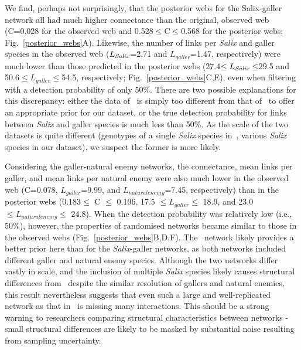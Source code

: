 \documentclass[12pt]{article}
\begin{document}
\begin{spacing}{2.0}
    We find, perhaps not surprisingly, that the posterior webs for the Salix-galler network all had much higher connectance than the original, observed web (C=0.028 for the observed web and 0.528$\leq$C$\leq$0.568 for the posterior webs; Fig.~\ref{posterior_webs}A). Likewise, the number of links per \emph{Salix} and galler species in the observed web ($L_{\emph{Salix}}$=2.71 and $L_{galler}$=1.47, respectively) were much lower than those predicted in the posterior webs (27.4$\leq L_{\emph{Salix}} \leq$29.5 and 50.6$\leq L_{galler} \leq $54.5, respectively; Fig.~\ref{posterior_webs}C,E), even when filtering with a detection probability of only 50\%. There are two possible explanations for this discrepancy: either the data of~\citet{Barbour2016} is simply too different from that of~\citet{Kopelke2017} to offer an appropriate prior for our dataset, or the true detection probability for links between \emph{Salix} and galler species is much less than 50\%. As the scale of the two datasets is quite different (genotypes of a single \emph{Salix} species in~\citet{Barbour2016}, various \emph{Salix} species in our dataset), we suspect the former is more likely.

    Considering the galler-natural enemy networks, the connectance, mean links per galler, and mean links per natural enemy were also much lower in the observed web (C=0.078, $L_{galler}$=9.99, and $L_{natural enemy}$=7.45, respectively) than in the posterior webs (0.183$\leq$ C $\leq$ 0.196, 17.5 $\leq L_{galler} \leq$ 18.9, and 23.0 $\leq L_{natural enemy} \leq$ 24.8). When the detection probability was relatively low (i.e., 50\%), however, the properties of randomised networks became similar to those in the observed webs (Fig.~\ref{posterior_webs}B,D,F). The~\citet{Barbour2016} network likely provides a better prior here than for the \emph{Salix}-galler networks, as both networks included different galler and natural enemy species. Although the two networks differ vastly in scale, and the inclusion of multiple \emph{Salix} species likely causes structural differences from~\citet{Barbour2016} despite the similar resolution of gallers and natural enemies, this result nevertheless suggests that even such a large and well-replicated network as that in~\citet{Kopelke2017} is missing many interactions. This should be a strong warning to researchers comparing structural characteristics between networks - small structural differences are likely to be masked by substantial noise resulting from sampling uncertainty.



\end{spacing}
\end{document}

